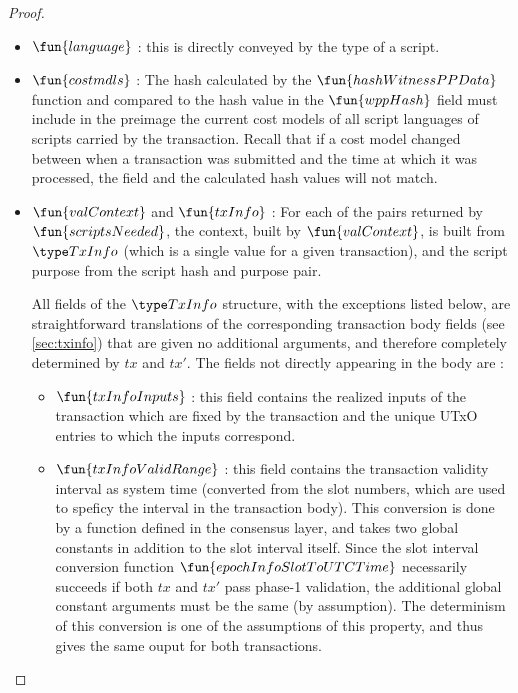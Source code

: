 \begin{property}
\begin{proof}
\begin{itemize}
      \item $\fun{language}$ : this is directly conveyed by the type of a script.

      \item $\fun{costmdls}$ : The hash calculated by the $\fun{hashWitnessPPData}$
      function and compared to the hash value in the $\fun{wppHash}$ field
      must include in the preimage the current cost models of
      all script languages of scripts carried by the transaction. Recall that
      if a cost model changed between when a transaction was submitted and the
      time at which it was processed, the field and the calculated hash values
      will not match.

      \item $\fun{valContext}$ and $\fun{txInfo}$ : For each of the pairs returned by $\fun{scriptsNeeded}$,
      the context, built by $\fun{valContext}$, is built from $\TxInfo$ (which is a single value for
      a given transaction), and the script purpose from the script hash and purpose pair.

      All fields of the $\TxInfo$
      structure, with the exceptions listed below,
      are straightforward translations of the corresponding transaction body fields (see \ref{sec:txinfo}) that
      are given no additional arguments,
      and therefore completely determined by $tx$ and $tx'$. The fields not directly
      appearing in the body are :

      \begin{itemize}
        \item $\fun{txInfoInputs}$ : this field contains the realized inputs of
        the transaction which are fixed by the transaction and the unique
        UTxO entries to which the inputs correspond.

        \item $\fun{txInfoValidRange}$ : this field contains the transaction
        validity interval as system time (converted from the slot numbers, which are
        used to speficy the interval in the transaction body). This conversion is
        done by a function defined in the consensus layer, and takes two global
        constants in addition to the slot interval itself. Since the slot interval
        conversion function $\fun{epochInfoSlotToUTCTime}$ necessarily
        succeeds if both $tx$ and $tx'$ pass phase-1 validation, the additional
        global constant arguments must be the same (by assumption). The determinism of this conversion
        is one of the assumptions of this property, and thus gives the same ouput
        for both transactions.


\end{itemize}
\end{itemize}
\end{proof}
\end{property}
